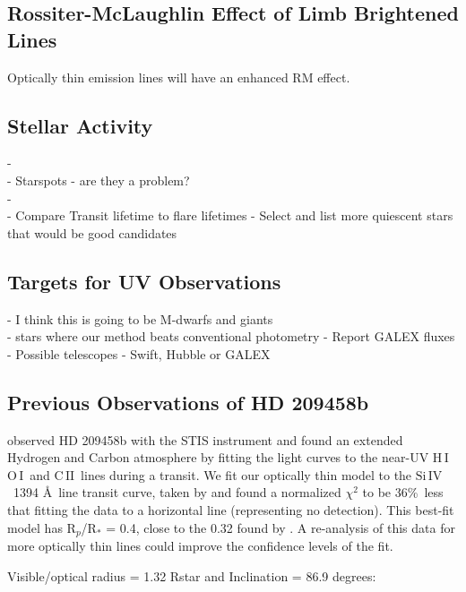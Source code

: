 \documentclass[manuscript]{aastex}
\newcommand{\cii}{\ensuremath{\mathrm{C}\,\scriptstyle \mathrm{II}}}
\newcommand{\oi}{\ensuremath{\mathrm{O}\,\scriptstyle \mathrm{I}}}
\newcommand{\hi}{\ensuremath{\mathrm{H}\,\scriptstyle \mathrm{I}}}
\newcommand{\siIV}{\ensuremath{\mathrm{Si}\,\scriptstyle \mathrm{IV}}}
\begin{document}
\subsection{Rossiter-McLaughlin Effect of Limb Brightened Lines}

Optically thin emission lines will have an enhanced RM effect.

\subsection{Stellar Activity} \label{labl:stactv}
-\\
-    Starspots - are they a problem? \\
-\\
-    Compare Transit lifetime to flare lifetimes
-  Select and list more quiescent stars that would be good candidates


\subsection{Targets for UV Observations} \label{labl:targ}
- I think this is going to be M-dwarfs and giants \\
- stars where our method beats conventional photometry
-      Report GALEX fluxes \\
-   Possible telescopes - Swift, Hubble or GALEX \\

\subsection{Previous Observations of HD 209458b}

\citet{viddisc} observed HD 209458b with the STIS instrument and found
an extended Hydrogen and Carbon atmosphere by fitting the light curves
to the near-UV \hi\, \oi\ and \cii\ lines during a transit. We fit our optically thin model to
the \siIV\ 1394 \AA\ line transit curve, taken by \citet{vidmad} and
found a normalized $\chi^2$ to be 36\%\ less that fitting the data to
a horizontal line (representing no detection). This best-fit model has
R$_p$/R$_*$ = 0.4, close to the 0.32 found by \citet{vidmad}. A
re-analysis of this data for more optically thin lines could improve
the confidence levels of the fit.

Visible/optical radius = 1.32 Rstar and Inclination = 86.9 degrees:   \citet{knutsonprop}
\end{document}
